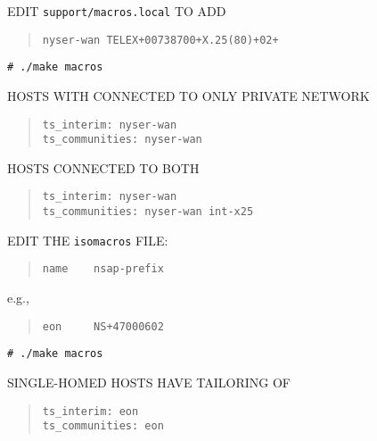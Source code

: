 \begin{bwslide}

\begin{nrtc}
\item	EDIT \verb"support/macros.local" TO ADD
\begin{quote}\small\begin{verbatim}
nyser-wan TELEX+00738700+X.25(80)+02+
\end{verbatim}\end{quote}

\item	\verb"# ./make macros"

\item	HOSTS WITH CONNECTED TO ONLY PRIVATE NETWORK
\begin{quote}\small\begin{verbatim}
ts_interim: nyser-wan
ts_communities: nyser-wan
\end{verbatim}\end{quote}

\item	HOSTS CONNECTED TO BOTH
\begin{quote}\small\begin{verbatim}
ts_interim: nyser-wan
ts_communities: nyser-wan int-x25
\end{verbatim}\end{quote}
\end{nrtc}
\end{bwslide}


\begin{bwslide}

\begin{nrtc}
\item	EDIT THE \verb"isomacros" FILE:
\begin{quote}\small\begin{verbatim}
name    nsap-prefix
\end{verbatim}\end{quote}
	e.g.,
\begin{quote}\small\begin{verbatim}
eon     NS+47000602
\end{verbatim}\end{quote}

\item	\verb"# ./make macros"

\item	SINGLE-HOMED HOSTS HAVE TAILORING OF
\begin{quote}\small\begin{verbatim}
ts_interim: eon
ts_communities: eon
\end{verbatim}\end{quote}
\end{nrtc}
\end{bwslide}
